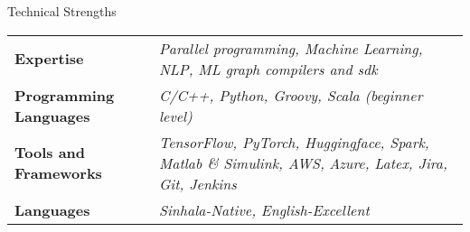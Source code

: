 \documentclass[
	11pt, %
]{./assets/resume} %
\begin{document}





\begin{rSection}{Technical Strengths}

	\def\arraystretch{1.5}

	\begin{tabular}{ l p{10cm}}
		\textbf{Expertise} & \emph{Parallel programming, Machine Learning, NLP, ML graph compilers and sdk} \\
		\textbf{Programming Languages} & \emph{C/C++, Python, Groovy, Scala (beginner level)} \\
		\textbf{Tools and Frameworks} & \emph{TensorFlow, PyTorch, Huggingface, Spark, Matlab \& Simulink, AWS,} \emph{Azure, Latex, Jira, Git, Jenkins} \\
		\textbf{Languages} & \emph{Sinhala-Native, English-Excellent} \\
	\end{tabular}

\end{rSection}
\end{document}
